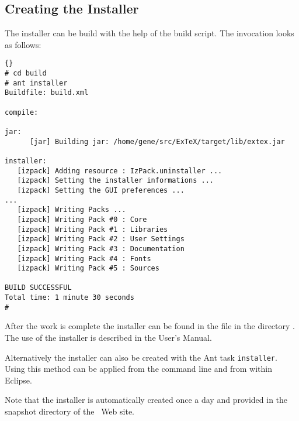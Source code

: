 \subsection{Creating the Installer}\label{sec:shell-installer}

The installer can be build with the help of the build script. The
invocation looks as follows:

\begin{lstlisting}{}
# cd build
# ant installer
Buildfile: build.xml

compile:

jar:
      [jar] Building jar: /home/gene/src/ExTeX/target/lib/extex.jar

installer:
   [izpack] Adding resource : IzPack.uninstaller ...
   [izpack] Setting the installer informations ...
   [izpack] Setting the GUI preferences ...
... 
   [izpack] Writing Packs ...
   [izpack] Writing Pack #0 : Core
   [izpack] Writing Pack #1 : Libraries
   [izpack] Writing Pack #2 : User Settings
   [izpack] Writing Pack #3 : Documentation
   [izpack] Writing Pack #4 : Fonts
   [izpack] Writing Pack #5 : Sources

BUILD SUCCESSFUL
Total time: 1 minute 30 seconds
#
\end{lstlisting}{}

After the work is complete the installer can be found in the file
 in the directory . The use of the
installer is described in the User's Manual.

Alternatively the installer can also be created with the Ant task
\texttt{installer}. Using this method can be applied from the command
line and from within Eclipse.

Note that the installer is automatically created once a day and
provided in the snapshot directory of the \ExTeX\ Web site.

